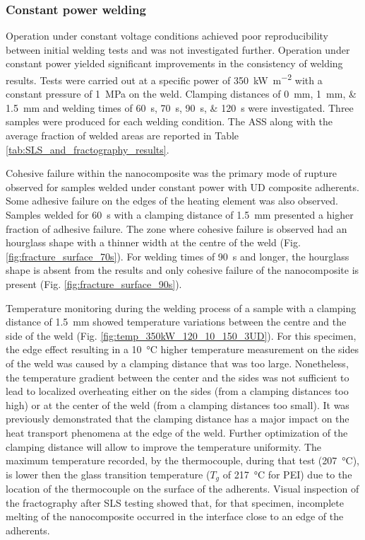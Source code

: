\documentclass[11pt,review,times]{elsarticle}
\begin{document}
\subsubsection{Constant power welding}
\FloatBarrier

Operation under constant voltage conditions achieved poor reproducibility between initial welding tests and was not investigated further. 
Operation under constant power yielded significant improvements in the consistency of welding results. 
Tests were carried out at a specific power of \SI{350}{\kW\per\square\metre} with a constant pressure of \SI{1}{\MPa} on the weld. 
Clamping distances of \SIlist{0;1;1.5}{\mm} and welding times of \SIlist{60;70;90;120}{\s} were investigated. 
Three samples were produced for each welding condition. 
The ASS along with the average fraction of welded areas are reported in Table \ref{tab:SLS_and_fractography_results}. 

Cohesive failure within the nanocomposite was the primary mode of rupture observed for samples welded under constant power with UD composite adherents.
Some adhesive failure on the edges of the heating element was also observed. 
Samples welded for \SI{60}{\s} with a clamping distance of \SI{1.5}{\mm} presented a higher fraction of adhesive failure. 
The zone where cohesive failure is observed had an hourglass shape with a thinner width at the centre of the weld (Fig. \ref{fig:fracture_surface_70s}). 
For welding times of \SI{90}{\s} and longer, the hourglass shape is absent from the results and only cohesive failure of the nanocomposite is present (Fig. \ref{fig:fracture_surface_90s}). 

Temperature monitoring during the welding process of a sample with a clamping distance of \SI{1.5}{\mm} showed temperature variations between the centre and the side of the weld (Fig. \ref{fig:temp_350kW_120_10_150_3UD}).
For this specimen, the edge effect resulting in a \SI{10}{\celsius} higher temperature measurement on the sides of the weld was caused by a clamping distance that was too large. 
Nonetheless, the temperature gradient between the center and the sides was not sufficient to lead to localized overheating either on the sides (from a clamping distances too high) or at the center of the weld (from a clamping distances too small). 
It was previously demonstrated that the clamping distance has a major impact on the heat transport phenomena at the edge of the weld.
Further optimization of the clamping distance will allow to improve the temperature uniformity. 
The maximum temperature recorded, by the thermocouple, during that test (\SI{207}{\celsius}), is lower then the glass transition temperature ($T_g$ of \SI{217}{\celsius} for PEI) due to the location of the thermocouple on the surface of the adherents. 
Visual inspection of the fractography after SLS testing showed that, for that specimen, incomplete melting of the nanocomposite occurred in the interface close to an edge of the adherents. 
\end{document}
